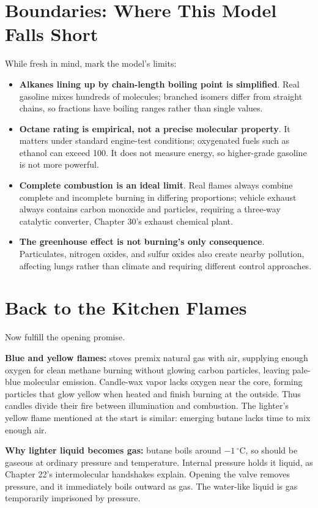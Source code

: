\section{Boundaries: Where This Model Falls Short}

While fresh in mind, mark the model's limits:

\begin{itemize}[itemsep=2pt]
\item \textbf{Alkanes lining up by chain-length boiling point is simplified}. Real gasoline mixes hundreds of molecules; branched isomers differ from straight chains, so fractions have boiling ranges rather than single values.
\item \textbf{Octane rating is empirical, not a precise molecular property}. It matters under standard engine-test conditions; oxygenated fuels such as ethanol can exceed 100. It does not measure energy, so higher-grade gasoline is not more powerful.
\item \textbf{Complete combustion is an ideal limit}. Real flames always combine complete and incomplete burning in differing proportions; vehicle exhaust always contains carbon monoxide and particles, requiring a three-way catalytic converter, Chapter 30's exhaust chemical plant.
\item \textbf{The greenhouse effect is not burning's only consequence}. Particulates, nitrogen oxides, and sulfur oxides also create nearby pollution, affecting lungs rather than climate and requiring different control approaches.
\end{itemize}

\section{Back to the Kitchen Flames}

Now fulfill the opening promise.

\textbf{Blue and yellow flames:} stoves premix natural gas with air, supplying enough oxygen for clean methane burning without glowing carbon particles, leaving pale-blue molecular emission. Candle-wax vapor lacks oxygen near the core, forming particles that glow yellow when heated and finish burning at the outside. Thus candles divide their fire between illumination and combustion. The lighter's yellow flame mentioned at the start is similar: emerging butane lacks time to mix enough air.

\textbf{Why lighter liquid becomes gas:} butane boils around $-1\,^{\circ}\mathrm{C}$, so should be gaseous at ordinary pressure and temperature. Internal pressure holds it liquid, as Chapter 22's intermolecular handshakes explain. Opening the valve removes pressure, and it immediately boils outward as gas. The water-like liquid is gas temporarily imprisoned by pressure.


